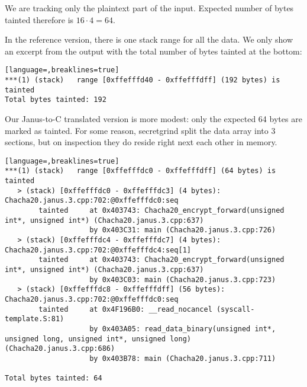 \documentclass[a4paper,10pt,openright]{memoir}
\begin{document}
We are tracking only the plaintext part of the input. Expected number 
of bytes tainted therefore is $16\cdot4 = 64$.



In the reference version, there is one stack range for all the data. We 
only show an excerpt from the output with the total number of bytes 
tainted at the bottom:

\begin{lstlisting}[language=,breaklines=true]
***(1) (stack)	 range [0xffefffd40 - 0xffefffdff] (192 bytes) is tainted
Total bytes tainted: 192
\end{lstlisting}

Our Janus-to-C translated version is more modest: only the expected 64 
bytes are marked as tainted. For some reason, secretgrind split 
the data array into 3 sections, but on inspection they do reside right 
next each other in memory.

\begin{lstlisting}[language=,breaklines=true]
***(1) (stack)	 range [0xffefffdc0 - 0xffefffdff] (64 bytes) is tainted
   > (stack) [0xffefffdc0 - 0xffefffdc3] (4 bytes): Chacha20.janus.3.cpp:702:@0xffefffdc0:seq
        tainted     at 0x403743: Chacha20_encrypt_forward(unsigned int*, unsigned int*) (Chacha20.janus.3.cpp:637)
                    by 0x403C31: main (Chacha20.janus.3.cpp:726)
   > (stack) [0xffefffdc4 - 0xffefffdc7] (4 bytes): Chacha20.janus.3.cpp:702:@0xffefffdc4:seq[1]
        tainted     at 0x403743: Chacha20_encrypt_forward(unsigned int*, unsigned int*) (Chacha20.janus.3.cpp:637)
                    by 0x403C03: main (Chacha20.janus.3.cpp:723)
   > (stack) [0xffefffdc8 - 0xffefffdff] (56 bytes): Chacha20.janus.3.cpp:702:@0xffefffdc0:seq
        tainted     at 0x4F196B0: __read_nocancel (syscall-template.S:81)
                    by 0x403A05: read_data_binary(unsigned int*, unsigned long, unsigned int*, unsigned long) (Chacha20.janus.3.cpp:686)
                    by 0x403B78: main (Chacha20.janus.3.cpp:711)

Total bytes tainted: 64
\end{lstlisting}
\end{document}
